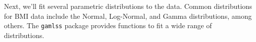Next, we'll fit several parametric distributions to the data. Common
distributions for BMI data include the Normal, Log-Normal, and Gamma
distributions, among others. The \texttt{gamlss} package provides
functions to fit a wide range of distributions.

\begin{Shaded}
\begin{Highlighting}[]
\OtherTok{\textless{}{-}} \NormalTok{, }\NormalTok{)}
\end{Highlighting}
\end{Shaded}

